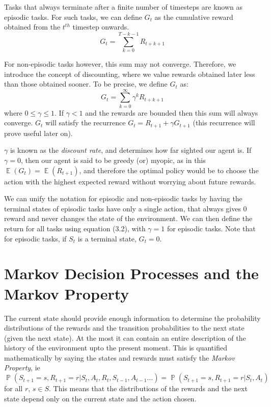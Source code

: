 \documentclass[12pt]{report}
\begin{document}
Tasks that always terminate after a finite number of timesteps are known as episodic tasks. For such tasks, we can define $G_{t}$ as the cumulative reward obtained from the $t^{th}$ timestep onwards.
\begin{equation}
    G_{t} = \sum\limits_{k = 0}^{T - k - 1} R_{t + k + 1}
\end{equation}

For non-episodic tasks however, this sum may not converge. Therefore, we introduce the concept of discounting, where we value rewards obtained later less than those obtained sooner. To be precise, we define $G_{t}$ as:
\begin{equation}
    G_{t} = \sum\limits_{k = 0}^{\infty} \gamma^{k}R_{t + k + 1}
\end{equation}
where $0 \leq \gamma \leq 1$. If $\gamma < 1$ and the rewards are bounded then this sum will always converge. $G_{t}$ will satisfy the recurrence $G_{t} = R_{t + 1} + \gamma G_{t + 1}$ (this recurrence will prove useful later on).

$\gamma$ is known as the \textit{discount rate}, and determines how far sighted our agent is. If $\gamma = 0$, then our 
agent is said to be greedy (or) myopic, as in this $\mathop{\mathbb{E}}(G_{t}) = \mathop{\mathbb{E}}(R_{t + 1})$, and therefore the optimal policy would be to choose the action with the highest expected reward without worrying about future rewards.

We can unify the notation for episodic and non-episodic tasks by having the terminal states of episodic tasks have only a single action, that always gives $0$ reward and never changes the state of the environment.
We can then define the return for all tasks using equation (3.2), with $\gamma = 1$ for episodic tasks. Note that for episodic tasks, if $S_{t}$ is a terminal state, $G_{t} = 0$.

\section{Markov Decision Processes and the Markov Property}
The current state should provide enough information to determine the probability distributions of the rewards and the transition probabilities to the next state (given the next state). At the most it can contain an entire description of the history of the environment 
upto the present moment. This is quantified mathematically by saying the states and rewards must satisfy the \textit{Markov Property}, ie 
\begin{equation}
    \mathop{\mathbb{P}}(S_{t + 1} = s, R_{t + 1} = r | S_{t}, A_{t}, R_{t}, S_{t - 1}, A_{t - 1} \dots) = \mathop{\mathbb{P}}(S_{t + 1} = s, R_{t + 1} = r | S_{t}, A_{t})
\end{equation}
for all $r$, $s \in S$. This means that the distributions of the rewards and the next state depend only on the current state and the action chosen.
\end{document}
